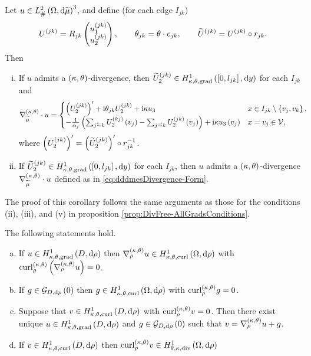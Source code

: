 \begin{cory}
	Let $u\in L^2_{\#}\left( \Omega,\mathrm{d} \widetilde{\mu} \right)^3$, and define (for each edge $I_{jk}$)
	\begin{align*}
		U^{(jk)} = R_{jk}\begin{pmatrix} u_1^{(jk)} \\ u_2^{(jk)} \end{pmatrix}, 
		\qquad \theta_{jk} = \theta\cdot e_{jk}, 
		\qquad \widetilde{U}^{(jk)} = U^{(jk)}\circ r_{jk}.
	\end{align*}	
	Then
	\begin{enumerate}[(i)]
		\item If $u$ admits a $\left( \kappa, \theta \right)$-divergence, then $\widetilde{U}_2^{(jk)}\in H^1_{\kappa,\theta,\mathrm{grad}}\left( \left[ 0,l_{jk} \right], \mathrm{d}y \right)$ for each $I_{jk}$ and 
		\begin{align} \label{eq:dddmesDivergence-Form}
			\ktgrad_{\dddmes}\cdot u &= 
			\begin{cases} 
				\bracs{U_2^{(jk)}}' + \rmi\qm_{jk}U_2^{(jk)} + \rmi\wavenumber u_3 &
				x\in I_{jk}\setminus\clbracs{v_j,v_k}, \\
				-\recip{\alpha_j}\bracs{\sum_{j\conRight k}U_2^{(kj)}\bracs{v_j} - \sum_{j\conLeft k}U_2^{(jk)}\bracs{v_j}} + \rmi\wavenumber u_3\bracs{v_j} &
				x=v_j\in\vertSet,
			\end{cases}
		\end{align}
		where $\left( U_2^{(jk)} \right)' = \left( \widetilde{U}_2^{(jk)} \right)'\circ r_{jk}^{-1}$.
		\item If $\widetilde{U}_2^{(jk)}\in H^1_{\kappa,\theta,\mathrm{grad}}\left( \left[ 0,l_{jk} \right], \mathrm{d}y \right)$ for each $I_{jk}$, then $u$ admits a $\left( \kappa, \theta \right)$-divergence $\nabla^{\left( \kappa, \theta \right)}_{\widetilde{\mu}}\cdot u$ defined as in \eqref{eq:dddmesDivergence-Form}.
	\end{enumerate}
\end{cory}
The proof of this corollary follows the same arguments as those for the conditions (ii), (iii), and (v) in proposition \ref{prop:DivFree-AllGradsConditions}.

\begin{theorem}[de Rham]
	The following statements hold.
	\begin{enumerate}[(a)]
		\item If $u\in H^1_{\kappa,\theta,\mathrm{grad}}\left( D, \mathrm{d}\rho \right)$ then $\nabla^{\left( \kappa, \theta \right)}_{\rho}u\in H^1_{\kappa,\theta,\mathrm{curl}}\left( \Omega, \mathrm{d}\rho \right)$ with $\mathrm{curl}_{\rho}^{\left( \kappa, \theta \right)}\left( \nabla^{\left( \kappa, \theta \right)}_{\rho}u \right)=0$.
		\item If $g\in\mathcal{G}_{ D, \mathrm{d}\rho}\left( 0 \right)$ then $g\in H^1_{\kappa,\theta,\mathrm{curl}}\left( \Omega, \mathrm{d}\rho \right)$ with $\mathrm{curl}_{\rho}^{\left( \kappa, \theta \right)}g=0$.
		\item Suppose that $v\in H^1_{\kappa,\theta,\mathrm{curl}}\left( D, \mathrm{d}\rho \right)$ with $\mathrm{curl}_{\rho}^{\left( \kappa, \theta \right)}v=0$.
		Then there exist unique $u\in H^1_{\kappa,\theta,\mathrm{grad}}\left( D, \mathrm{d}\rho \right)$ and $g\in\mathcal{G}_{ D, \mathrm{d}\rho}\left( 0 \right)$ such that $v = \nabla^{\left( \kappa, \theta \right)}_{\rho}u + g$.
		\item If $v\in H^1_{\kappa,\theta,\mathrm{curl}}\left( D, \mathrm{d}\rho \right)$ then $\mathrm{curl}_{\rho}^{\left( \kappa, \theta \right)}v\in H^1_{\theta,\kappa,\mathrm{div}}\left( \Omega,\mathrm{d}\rho \right)$
	\end{enumerate}
\end{theorem}